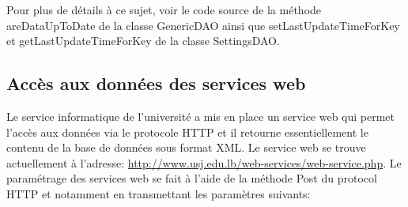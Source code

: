 		
		Pour plus de détails à ce sujet, voir le code source de la  méthode areDataUpToDate de la classe GenericDAO ainsi que setLastUpdateTimeForKey et getLastUpdateTimeForKey de la classe  SettingsDAO.
		
	\subsection{Accès aux données des services web}
	Le service informatique de l'université a mis en place un service web qui permet l'accès aux données via le protocole HTTP et il retourne essentiellement le contenu de la base de données sous format XML. Le service web se trouve actuellement à l'adresse: \url{http://www.usj.edu.lb/web-services/web-service.php}. Le paramétrage des services web se fait à l'aide de la méthode Post du protocol HTTP et notamment en transmettant les paramètres suivants:
